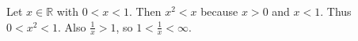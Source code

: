Let $x \in \mathbb{R}$ with $0 < x < 1$.
Then $x^{2} < x$ because $x > 0$ and $x < 1$.
Thus $0 < x^{2} < 1$.
Also $\frac{1}{x} > 1$, so $1 < \frac{1}{x} < \infty$.